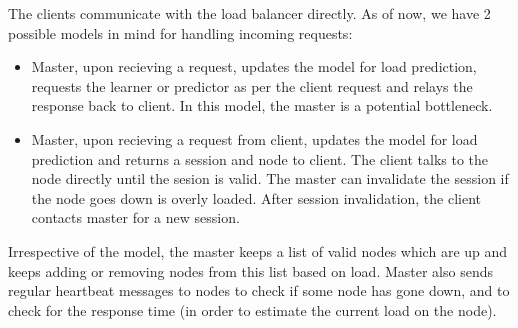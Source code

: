 \documentclass[letterpaper]{article}
\begin{document}
The clients communicate with the load balancer directly. As of now, we have 2 possible
models in mind for handling incoming requests:
\begin{itemize}
\item Master, upon recieving a request, updates the model for load prediction,
requests the learner or predictor as per the client request and relays the
response back to client. In this model, the master is a potential bottleneck.
\item Master, upon recieving a request from client, updates the model for load
prediction and returns a session and node to client. The client talks to the
node directly until the sesion is valid. The master can invalidate the session
if the node goes down is overly loaded. After session invalidation, the client
contacts master for a new session.
\end{itemize}

Irrespective of the model, the master keeps a list of valid nodes which are up
and keeps adding or removing nodes from this list based on load. Master also
sends regular heartbeat messages to nodes to check if some node has gone down,
and to check for the response time (in order to estimate the current load on the
node).



\end{document}
